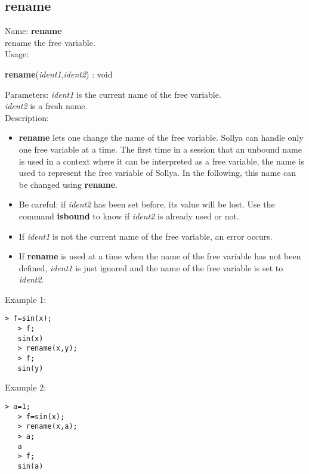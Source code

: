 \subsection{ rename }
\noindent Name: \textbf{rename}\\
rename the free variable.\\

\noindent Usage: 
\begin{center}
\textbf{rename}(\emph{ident1},\emph{ident2}) : \textsf{void}\\
\end{center}
Parameters: 
\emph{ident1} is the current name of the free variable.\\
\emph{ident2} is a fresh name.\\

\noindent Description: \begin{itemize}

\item \textbf{rename} lets one change the name of the free variable. Sollya can handle only
   one free variable at a time. The first time in a session that an unbound name 
   is used in a context where it can be interpreted as a free variable, the name
   is used to represent the free variable of Sollya. In the following, this name
   can be changed using \textbf{rename}.

\item Be careful: if \emph{ident2} has been set before, its value will be lost. Use the 
   command \textbf{isbound} to know if \emph{ident2} is already used or not.

\item If \emph{ident1} is not the current name of the free variable, an error occurs.

\item If \textbf{rename} is used at a time when the name of the free variable has not been 
   defined, \emph{ident1} is just ignored and the name of the free variable is 
   set to \emph{ident2}.
\end{itemize}
\noindent Example 1: 
\begin{center}\begin{minipage}{14.8cm}\begin{Verbatim}[frame=single]
   > f=sin(x);
   > f;
   sin(x)
   > rename(x,y);
   > f;
   sin(y)
\end{Verbatim}
\end{minipage}\end{center}
\noindent Example 2: 
\begin{center}\begin{minipage}{14.8cm}\begin{Verbatim}[frame=single]
   > a=1;
   > f=sin(x);
   > rename(x,a);
   > a;
   a
   > f;
   sin(a)
\end{Verbatim}
\end{minipage}\end{center}
